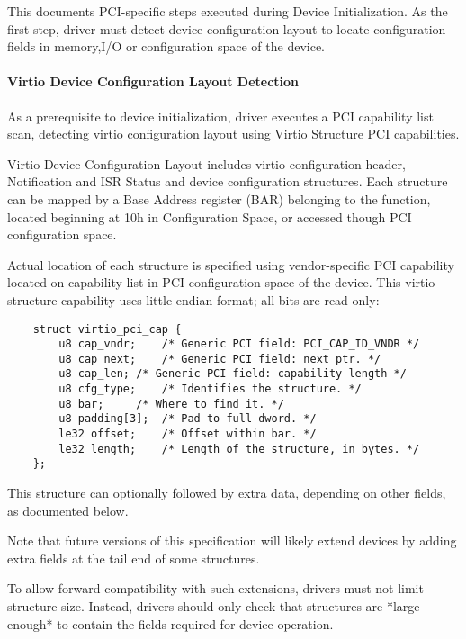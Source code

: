 This documents PCI-specific steps executed during Device Initialization.
As the first step, driver must detect device configuration layout
to locate configuration fields in memory,I/O or configuration space of the
device.

\paragraph{Virtio Device Configuration Layout Detection}\label{sec:Virtio Transport Options / Virtio Over PCI Bus / PCI-specific Initialization And Device Operation / Device Initialization / Virtio Device Configuration Layout Detection}

As a prerequisite to device initialization, driver executes a
PCI capability list scan, detecting virtio configuration layout using Virtio
Structure PCI capabilities.

Virtio Device Configuration Layout includes virtio configuration header, Notification
and ISR Status and device configuration structures.
Each structure can be mapped by a Base Address register (BAR) belonging to
the function, located beginning at 10h in Configuration Space,
or accessed though PCI configuration space.

Actual location of each structure is specified using vendor-specific PCI capability located
on capability list in PCI configuration space of the device.
This virtio structure capability uses little-endian format; all bits are
read-only:

\begin{lstlisting}
	struct virtio_pci_cap {
		u8 cap_vndr;	/* Generic PCI field: PCI_CAP_ID_VNDR */
		u8 cap_next;	/* Generic PCI field: next ptr. */
		u8 cap_len;	/* Generic PCI field: capability length */
		u8 cfg_type;	/* Identifies the structure. */
		u8 bar;		/* Where to find it. */
		u8 padding[3];	/* Pad to full dword. */
		le32 offset;	/* Offset within bar. */
		le32 length;	/* Length of the structure, in bytes. */
	};
\end{lstlisting}

This structure can optionally followed by extra data, depending on
other fields, as documented below.

Note that future versions of this specification will likely
extend devices by adding extra fields at the tail end of some structures.

To allow forward compatibility with such extensions, drivers must
not limit structure size.  Instead, drivers should only
check that structures are *large enough* to contain the fields
required for device operation.

